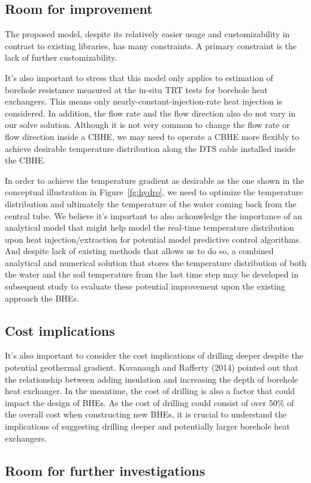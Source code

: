 \subsection{Room for improvement}
	The proposed model, despite its relatively easier usage and customizability in contrast to existing libraries, has many constraints. A primary constraint is the lack of further customizability.
	
	It's also important to stress that this model only applies to estimation of borehole resistance measured at the in-situ TRT tests for borehole heat exchangers. This means only nearly-constant-injection-rate heat injection is considered. In addition, the flow rate and the flow direction also do not vary in our solve solution. Although it is not very common to change the flow rate or flow direction inside a CBHE, we may need to operate a CBHE more flexibly to achieve desirable temperature distribution along the DTS cable installed inside the CBHE.
	
	In order to achieve the temperature gradient as desirable as the one shown in the conceptual illustration in Figure~\ref{fg:hydro}, we need to optimize the temperature distribution and ultimately the temperature of the water coming back from the central tube. We believe it's important to also ackonwledge the importance of an analytical model that might help model the real-time temperature distribution upon heat injection/extraction for potential model predictive control algorithms. And despite lack of existing methods that allows us to do so, a combined analytical and numerical solution that stores the temperature distribution of both the water and the soil temperature from the last time step may be developed in subsequent study to evaluate these potential improvement upon the existing approach the BHEs. 
	
	  
\subsection{Cost implications}
	It's also important to consider the cost implications of drilling deeper despite the potential geothermal gradient. Kavanaugh and Rafferty (2014) pointed out that the relationship between adding insulation and increasing the depth of borehole heat exchanger. In the meantime, the cost of drilling is also a factor that could impact the design of BHEs. As the cost of drilling could consist of over 50\% of the overall cost when constructing new BHEs, it is crucial to understand the implications of suggesting drilling deeper and potentially larger borehole heat exchangers.
\subsection{Room for further investigations}
	
	
